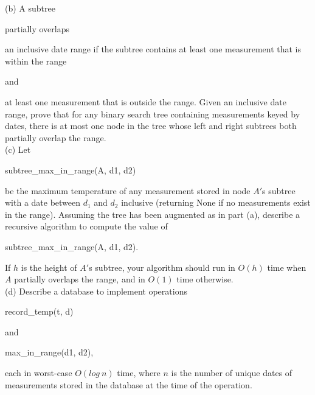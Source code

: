\documentclass[12pt]{amsart}
\begin{document}
(b) A subtree \begin{bf} partially overlaps \end{bf} an inclusive date range if the subtree contains at least one measurement that is within the range \begin{bf} and \end{bf} at least one measurement that is outside the range. Given an inclusive date range, prove that for any binary search tree containing
measurements keyed by dates, there is at most one node in the tree whose left and right subtrees both partially overlap the range. 
\\

(c) Let \begin{tt} subtree\_max\_in\_range(A, d1, d2)\end{tt} be the maximum temperature of any
measurement stored in node $A'$s subtree with a date between $d_1$ and $d_2$ inclusive (returning None if no measurements exist in the range). Assuming the tree has been augmented as in part (a), describe a recursive algorithm to compute the value of \begin{tt} subtree\_max\_in\_range(A, d1, d2).\end{tt} If $h$ is the height of $A'$s subtree, your algorithm should run in $O(h)$ time when $A$ partially overlaps the range, and in $O(1)$ time otherwise. 
\\

(d) Describe a database to implement operations \begin{tt} record\_temp(t, d)\end{tt} and \begin{tt} max\_in\_range(d1, d2),\end{tt} each in worst-case $O(log\:n)$ time, where $n$ is the number
of unique dates of measurements stored in the database at the time of the operation. 
\end{document}
